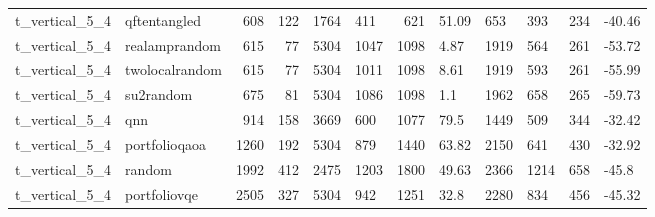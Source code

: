 \begin{longtable}{llrrllrlllrl}
t\_vertical\_5\_4 & qftentangled & 608 & 122 & 1764 & 411 & 621 & 51.09 & 653 & 393 & 234 & -40.46 \\
t\_vertical\_5\_4 & realamprandom & 615 & 77 & 5304 & 1047 & 1098 & 4.87 & 1919 & 564 & 261 & -53.72 \\
t\_vertical\_5\_4 & twolocalrandom & 615 & 77 & 5304 & 1011 & 1098 & 8.61 & 1919 & 593 & 261 & -55.99 \\
t\_vertical\_5\_4 & su2random & 675 & 81 & 5304 & 1086 & 1098 & 1.1 & 1962 & 658 & 265 & -59.73 \\
t\_vertical\_5\_4 & qnn & 914 & 158 & 3669 & 600 & 1077 & 79.5 & 1449 & 509 & 344 & -32.42 \\
t\_vertical\_5\_4 & portfolioqaoa & 1260 & 192 & 5304 & 879 & 1440 & 63.82 & 2150 & 641 & 430 & -32.92 \\
t\_vertical\_5\_4 & random & 1992 & 412 & 2475 & 1203 & 1800 & 49.63 & 2366 & 1214 & 658 & -45.8 \\
t\_vertical\_5\_4 & portfoliovqe & 2505 & 327 & 5304 & 942 & 1251 & 32.8 & 2280 & 834 & 456 & -45.32 \\
\end{longtable}
